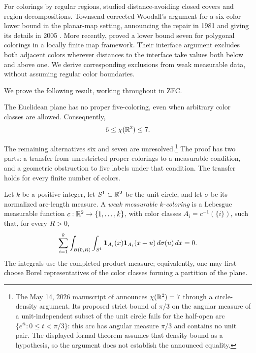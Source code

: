 For colorings by regular regions, \citet{Woodall1973} studied
distance-avoiding closed covers and region decompositions. Townsend
corrected Woodall's argument for a six-color lower bound in the
planar-map setting, announcing the repair in 1981 and giving its details
in 2005 \citep{Townsend1981,Townsend2005}. More recently,
\citet{SokolovVoronov2025} proved a lower bound seven for polygonal
colorings in a locally finite map framework. Their interface argument
excludes both adjacent colors wherever distances to the interface take
values both below and above one. We derive corresponding exclusions
from weak measurable data, without assuming regular color boundaries.

We prove the following result, working throughout in ZFC.

\begin{theorem}\label{thm:main}
The Euclidean plane has no proper five-coloring, even when arbitrary
color classes are allowed. Consequently,
\[
  6\le \chi(\mathbb R^2)\le 7.
\]
\end{theorem}

The remaining alternatives six and seven are unresolved.\footnote{
The May 14, 2026 manuscript of \citet{Reed2026} announces
$\chi(\mathbb R^2)=7$ through a circle-density argument. Its proposed strict
bound of $\pi/3$ on the angular measure of a unit-independent subset
of the unit circle fails for the half-open arc
$\{e^{it}:0\le t<\pi/3\}$: this arc has angular measure $\pi/3$
and contains no unit pair. The displayed formal theorem assumes that
density bound as a hypothesis, so the argument does not establish the
announced equality.}
The proof has two parts: a transfer from unrestricted proper colorings to a
measurable condition, and a geometric obstruction to five labels under that condition.
The transfer holds for every finite number of colors.

\begin{definition}\label{def:weak-coloring}
Let $k$ be a positive integer, let $S^1\subset\mathbb R^2$ be the unit circle,
and let $\sigma$ be its normalized arc-length measure. A
\emph{weak measurable $k$-coloring} is a Lebesgue measurable function
$c:\mathbb R^2\to\{1,\ldots,k\}$, with color classes $A_i=c^{-1}(\{i\})$,
such that, for every $R>0$,
\[
  \sum_{i=1}^k\int_{B(0,R)}\int_{S^1}
  \mathbf 1_{A_i}(x)\mathbf 1_{A_i}(x+u)\,d\sigma(u)\,dx=0.
\]
The integrals use the completed product measure; equivalently, one
may first choose Borel representatives of the color classes forming
a partition of the plane.
\end{definition}

